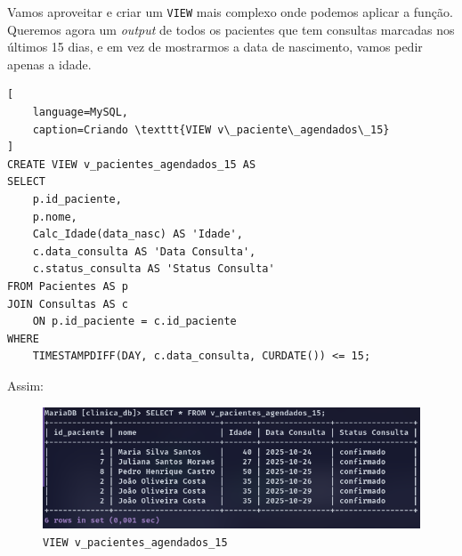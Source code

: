  Vamos aproveitar e criar um \texttt{VIEW} mais complexo onde podemos aplicar a função. Queremos agora um \textit{output} de todos os pacientes que tem consultas marcadas nos últimos 15 dias, e em vez de mostrarmos a data de nascimento, vamos pedir apenas a idade.

\begin{lstlisting}[
    language=MySQL,
    caption=Criando \texttt{VIEW v\_paciente\_agendados\_15}
]
CREATE VIEW v_pacientes_agendados_15 AS
SELECT 
    p.id_paciente,
    p.nome,
    Calc_Idade(data_nasc) AS 'Idade',
    c.data_consulta AS 'Data Consulta',
    c.status_consulta AS 'Status Consulta'
FROM Pacientes AS p
JOIN Consultas AS c
    ON p.id_paciente = c.id_paciente
WHERE
    TIMESTAMPDIFF(DAY, c.data_consulta, CURDATE()) <= 15;
\end{lstlisting}

Assim:

\begin{figure}[H]
    \centering
    \includegraphics[width=1\linewidth]{Text//Proc/image.png}
    \caption{\texttt{VIEW v\_pacientes\_agendados\_15}}
\end{figure}

